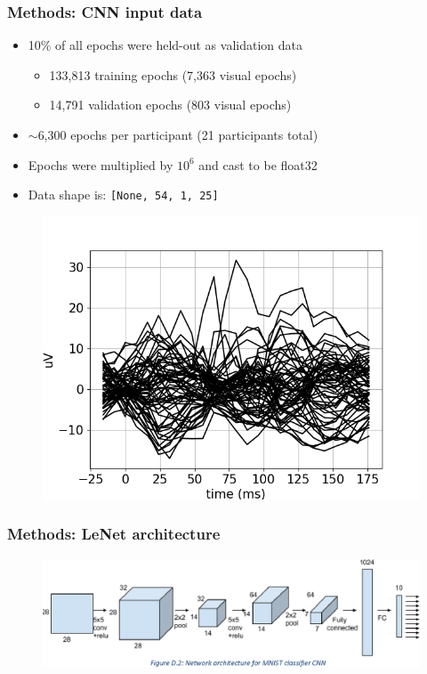 \documentclass{beamer}
\begin{document}
\begin{frame}
	\frametitle{Methods: CNN input data}
	
	\begin{itemize}

		\item 10\% of all epochs were held-out as validation data
		\begin{itemize}
			\item 133,813 training epochs (7,363 visual epochs)
			\item 14,791 validation epochs (803 visual epochs)
		\end{itemize}

		\item $\mathtt{\sim}$6,300 epochs per participant (21 participants total)
	
		\item Epochs were multiplied by $10^6$ and cast to be float32

		\item Data shape is: \texttt{[None, 54, 1, 25]}

	\end{itemize}

	\begin{figure}
		\centering
		\includegraphics[scale=0.4]{fig12.png}
	\end{figure}

\end{frame}

\begin{frame}
	\frametitle{Methods: LeNet architecture}

	\begin{figure}
		\centering
		\includegraphics[scale=0.25]{fig13.png}
	\end{figure}
	
\end{frame}
\end{document}
